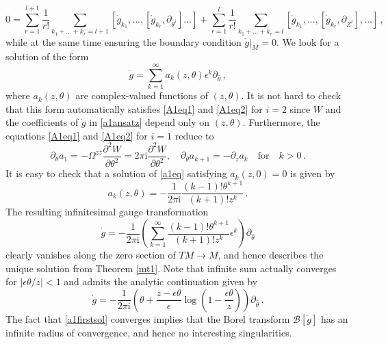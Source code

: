 \documentclass{article}
\theoremstyle{definition}
\numberwithin{equation}{section}
\begin{document}
\begin{equation}\label{A1eq2}
0=\sum_{r=1}^{l+1}\frac{1}{r!}\sum_{k_1+...+k_r=l+1}[\dot{g}_{k_1},...,[\dot{g}_{k_r},\partial_{\theta^i}]...] + \sum_{r=1}^{l}\frac{1}{r!}\sum_{k_1+...+k_r=l}[\dot{g}_{k_1},...,[\dot{g}_{k_r},\partial_{Z^i}],...]\,,    
\end{equation}
while at the same time ensuring the boundary condition $\dot{g}|_M=0$. We look for a solution of the form 
\begin{equation}\label{a1ansatz}
    \dot{g}=\sum_{k=1}^{\infty}a_k(z,\theta)\epsilon^{k}\partial_{\hat{\theta}}\,,
\end{equation}
where $a_k(z,\theta)$ are complex-valued functions of $(z,\theta)$. It is not hard to check that this form automatically satisfies \eqref{A1eq1} and \eqref{A1eq2} for $i=2$ since $W$ and the coefficients of $\dot{g}$ in \eqref{a1ansatz} depend only on $(z,\theta)$. Furthermore, the equations \eqref{A1eq1} and \eqref{A1eq2} for $i=1$ reduce to 
\begin{equation}\label{a1eq}
    \partial_{\theta}a_1=-\Omega^{z\hat{z}}\frac{\partial^2 W}{\partial \theta^2}=2\pi \mathrm{i}\frac{\partial^2 W}{\partial \theta^2}, \quad \partial_{\theta}a_{k+1}=-\partial_{z}a_k \quad \text{for} \quad k>0\,.
\end{equation}
It is easy to check that a solution of \eqref{a1eq} satisfying $a_k(z,0)=0$ is given by 
\begin{equation*}
   a_k(z,\theta)=-\frac{1}{2\pi \mathrm{i}}\frac{(k-1)!\theta^{k+1}}{(k+1)!z^k}\,.
\end{equation*}
The resulting infinitesimal gauge transformation 
\begin{equation}\label{a1firstsol}
    \dot{g}=-\frac{1}{2\pi \mathrm{i}}\left(\sum_{k=1}^{\infty}\frac{(k-1)!\theta^{k+1}}{(k+1)!z^k}\epsilon^k\right)\partial_{\hat{\theta}}
\end{equation}
clearly vanishes along the zero section of $TM\to M$, and hence describes the unique solution from Theorem \ref{mt1}. Note that infinite sum actually converges for $|\epsilon\theta/z|<1$ and admits the analytic continuation given by 
\begin{equation*}
    \dot{g} = -\frac{1}{2\pi \mathrm{i}}\left(\theta+\frac{z-\epsilon \theta}{\epsilon}\log\left(1-\frac{\epsilon \theta}{z}\right)\right)\partial_{\hat{\theta}}\,.
\end{equation*}
The fact that \eqref{a1firstsol} converges  implies that the Borel transform $\mathcal{B}[\dot{g}]$ has an infinite radius of convergence, and hence no interesting singularities.  \\
\end{document}

